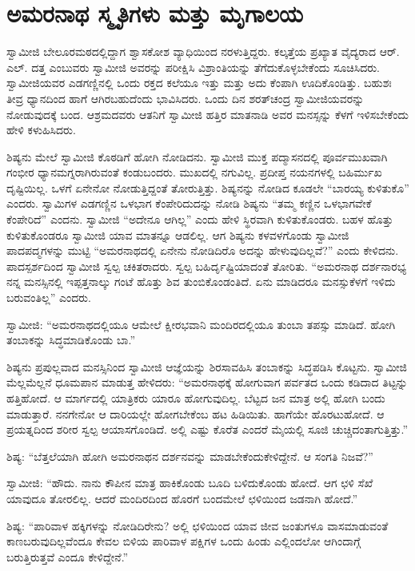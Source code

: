 
\chapter{ಅಮರನಾಥ ಸ್ಮೃತಿಗಳು ಮತ್ತು ಮೃಗಾಲಯ }

 ಸ್ವಾಮೀಜಿ ಬೇಲೂರಮಠದಲ್ಲಿದ್ದಾಗ ಶ್ವಾಸಕೋಶ ವ್ಯಾಧಿಯಿಂದ ನರಳುತ್ತಿದ್ದರು. ಕಲ್ಕತ್ತೆಯ ಪ್ರಖ್ಯಾತ ವೈದ್ಯರಾದ ಆರ್. ಎಲ್. ದತ್ತ ಎಂಬುವರು ಸ್ವಾಮೀಜಿ ಅವರನ್ನು ಪರೀಕ್ಷಿಸಿ ವಿಶ್ರಾಂತಿಯನ್ನು ತೆಗೆದುಕೊಳ್ಳಬೇಕೆಂದು ಸೂಚಿಸಿದರು. ಸ್ವಾಮೀಜಿಯವರ ಎಡಗಣ್ಣಿನಲ್ಲಿ ಒಂದು ರಕ್ತದ ಕಲೆಯೂ ಇತ್ತು ಮತ್ತು ಅದು ಕೆಂಪಾಗಿ ಊದಿಕೊಂಡಿತ್ತು. ಬಹುಶಃ ತೀವ್ರ ಧ್ಯಾನದಿಂದ ಹಾಗೆ ಆಗಿರಬಹುದೆಂದು ಭಾವಿಸಿದರು. ಒಂದು ದಿನ ಶರತ್‍ಚಂದ್ರ ಸ್ವಾಮೀಜಿಯವರನ್ನು ನೋಡುವುದಕ್ಕೆ ಬಂದ. ಆಶ್ರಮದವರು ಆತನಿಗೆ ಸ್ವಾಮೀಜಿ ಹತ್ತಿರ ಮಾತನಾಡಿ ಅವರ ಮನಸ್ಸನ್ನು ಕೆಳಗೆ ಇಳಿಸಬೇಕೆಂದು ಹೇಳಿ ಕಳುಹಿಸಿದರು. 

 ಶಿಷ್ಯನು ಮೇಲೆ ಸ್ವಾಮೀಜಿ ಕೊಠಡಿಗೆ ಹೋಗಿ ನೋಡಿದನು. ಸ್ವಾಮೀಜಿ ಮುಕ್ತ ಪದ್ಮಾಸನದಲ್ಲಿ ಪೂರ್ವಮುಖವಾಗಿ ಗಂಭೀರ ಧ್ಯಾನಮಗ್ನರಾಗಿರುವಂತೆ ಕಂಡುಬಂದರು. ಮುಖದಲ್ಲಿ ನಗುವಿಲ್ಲ. ಪ್ರದೀಪ್ತ ನಯನಗಳಲ್ಲಿ ಬಹಿರ್ಮುಖ ದೃಷ್ಟಿಯಿಲ್ಲ. ಒಳಗೆ ಏನೇನೋ ನೋಡುತ್ತಿದ್ದಂತೆ ತೋರುತ್ತಿತ್ತು. ಶಿಷ್ಯನನ್ನು ನೋಡಿದ ಕೂಡಲೇ “ಬಾರಯ್ಯ ಕುಳಿತುಕೊ” ಎಂದರು. ಸ್ವಾಮಿಗಳ ಎಡಗಣ್ಣಿನ ಒಳಭಾಗ ಕೆಂಪೇರಿದುದನ್ನು ನೋಡಿ ಶಿಷ್ಯನು “ತಮ್ಮ ಕಣ್ಣಿನ ಒಳಭಾಗವೇಕೆ ಕೆಂಪೇರಿದೆ” ಎಂದನು. ಸ್ವಾಮೀಜಿ “ಅದೇನೂ ಆಗಿಲ್ಲ” ಎಂದು ಹೇಳಿ ಸ್ಥಿರವಾಗಿ ಕುಳಿತುಕೊಂಡರು. ಬಹಳ ಹೊತ್ತು ಕುಳಿತುಕೊಂಡರೂ ಸ್ವಾಮೀಜಿ ಯಾವ ಮಾತನ್ನೂ ಆಡಲಿಲ್ಲ. ಆಗ ಶಿಷ್ಯನು ಕಳವಳಗೊಂಡು ಸ್ವಾಮೀಜಿ ಪಾದಪದ್ಮಗಳನ್ನು ಮುಟ್ಟಿ “ಅಮರನಾಥದಲ್ಲಿ ಏನೇನು ನೋಡಿದಿರೊ ಅದನ್ನು ಹೇಳುವುದಿಲ್ಲವೆ?” ಎಂದು ಕೇಳಿದನು. ಪಾದಸ್ಪರ್ಶದಿಂದ ಸ್ವಾಮೀಜಿ ಸ್ವಲ್ಪ ಚಕಿತರಾದರು. ಸ್ವಲ್ಪ ಬಹಿರ್ದೃಷ್ಟಿಯಾದಂತೆ ತೋರಿತು. “ಅಮರನಾಥ ದರ್ಶನಾರಭ್ಯ ನನ್ನ ಮನಸ್ಸಿನಲ್ಲಿ ಇಪ್ಪತ್ತನಾಲ್ಕು ಗಂಟೆ ಹೊತ್ತು ಶಿವ ತುಂಬಿಕೊಂಡಂತಿದೆ. ಏನು ಮಾಡಿದರೂ ಮನಸ್ಸು\break ಕೆಳಗೆ ಇಳಿದು ಬರುವಂತಿಲ್ಲ” ಎಂದರು. 

 ಸ್ವಾಮೀಜಿ: “ಅಮರನಾಥದಲ್ಲಿಯೂ ಆಮೇಲೆ ಕ್ಷೀರಭವಾನಿ ಮಂದಿರದಲ್ಲಿಯೂ ತುಂಬಾ ತಪಸ್ಸು ಮಾಡಿದೆ. ಹೋಗಿ ತಂಬಾಕನ್ನು ಸಿದ್ಧಮಾಡಿಕೊಂಡು ಬಾ.” 

 ಶಿಷ್ಯನು ಪ್ರಪುಲ್ಲವಾದ ಮನಸ್ಸಿನಿಂದ ಸ್ವಾಮೀಜಿ ಆಜ್ಞೆಯನ್ನು ಶಿರಸಾವಹಿಸಿ ತಂಬಾಕನ್ನು ಸಿದ್ಧಪಡಿಸಿ ಕೊಟ್ಟನು. ಸ್ವಾಮೀಜಿ ಮೆಲ್ಲಮೆಲ್ಲನೆ ಧೂಮಪಾನ ಮಾಡುತ್ತ ಹೇಳಿದರು: “ಅಮರನಾಥಕ್ಕೆ ಹೋಗುವಾಗ ಪರ್ವತದ ಒಂದು ಕಡಿದಾದ ತಿಟ್ಟನ್ನು ಹತ್ತಿಹೋದೆ. ಆ ಮಾರ್ಗದಲ್ಲಿ ಯಾತ್ರಿಕರು ಯಾರೂ ಹೋಗುವುದಿಲ್ಲ. ಬೆಟ್ಟದ ಜನ ಮಾತ್ರ ಅಲ್ಲಿ ಹೋಗಿ ಬಂದು ಮಾಡುತ್ತಾರೆ. ನನಗೇನೋ ಆ ದಾರಿಯಲ್ಲೇ ಹೋಗಬೇಕೆಂಬ ಹಟ ಹಿಡಿಯಿತು. ಹಾಗೆಯೇ ಹೊರಟುಹೋದೆ. ಆ ಪ್ರಯತ್ನದಿಂದ ಶರೀರ ಸ್ವಲ್ಪ ಆಯಾಸಗೊಂಡಿದೆ. ಅಲ್ಲಿ ಎಷ್ಟು ಕೊರೆತ ಎಂದರೆ ಮೈಯಲ್ಲಿ ಸೂಜಿ ಚುಚ್ಚಿದಂತಾಗುತ್ತಿತ್ತು.” 

 ಶಿಷ್ಯ: “ಬೆತ್ತಲೆಯಾಗಿ ಹೋಗಿ ಅಮರನಾಥನ ದರ್ಶನವನ್ನು ಮಾಡಬೇಕೆಂದು\break ಕೇಳಿದ್ದೇನೆ. ಆ ಸಂಗತಿ ನಿಜವೆ?” 

 ಸ್ವಾಮೀಜಿ: “ಹೌದು. ನಾನು ಕೌಪೀನ ಮಾತ್ರ ಹಾಕಿಕೊಂಡು ಬೂದಿ ಬಳಿದುಕೊಂಡು ಹೋದೆ. ಆಗ ಛಳಿ ಸೆಖೆ ಯಾವುದೂ ತೋರಲಿಲ್ಲ. ಆದರೆ ಮಂದಿರದಿಂದ ಹೊರಗೆ ಬಂದಮೇಲೆ ಛಳಿಯಿಂದ ಜಡನಾಗಿ ಹೋದೆ.” 

 ಶಿಷ್ಯ: “ಪಾರಿವಾಳ ಹಕ್ಕಿಗಳನ್ನು ನೋಡಿದಿರೇನು? ಅಲ್ಲಿ ಛಳಿಯಿಂದ ಯಾವ ಜೀವ ಜಂತುಗಳೂ ವಾಸಮಾಡುವಂತೆ ಕಾಣಬರುವುದಿಲ್ಲವೆಂದೂ ಕೇವಲ ಬಿಳಿಯ ಪಾರಿವಾಳ ಪಕ್ಷಿಗಳ ಒಂದು ಹಿಂಡು ಎಲ್ಲಿಂದಲೋ ಆಗಿಂದಾಗ್ಗೆ ಬರುತ್ತಿರುತ್ತವೆ ಎಂದೂ ಕೇಳಿದ್ದೇನೆ.” 

